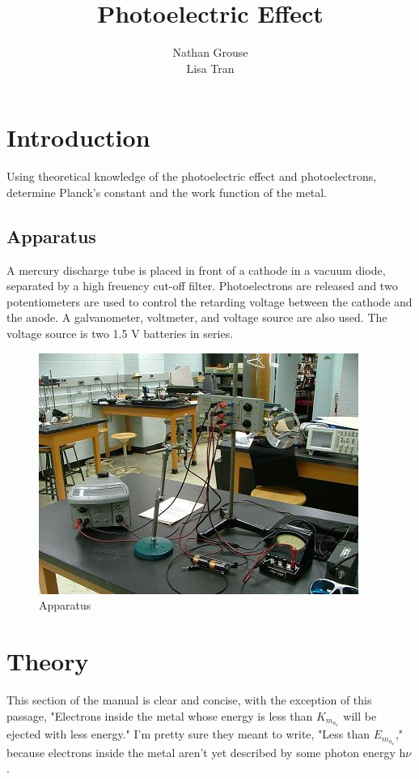 \documentclass[12pt]{article}
\title{Photoelectric Effect}
\author{Nathan Grouse\\Lisa Tran}
\begin{document}
\maketitle

\section{Introduction}
\indent \indent Using theoretical knowledge of the photoelectric effect and photoelectrons, determine Planck's constant and the work function of the metal.

\subsection{Apparatus}
\indent \indent A mercury discharge tube is placed in front of a cathode in a vacuum diode, separated by a high freuency cut-off filter. Photoelectrons are released and two potentiometers are used to control the retarding voltage between the cathode and the anode. A galvanometer, voltmeter, and voltage source are also used. The voltage source is two 1.5 V batteries in series.

\begin{figure}[H]
\centering
\hspace{-0.0in}\includegraphics[scale=1.0]{apparatus.png}
\caption{Apparatus \label{fig:setup}}
\end{figure}

\section{Theory}
\indent \indent This section of the manual is clear and concise, with the exception of this passage, "Electrons inside the metal whose energy is less than $K_m_a_x$ will be ejected with less energy." I'm pretty sure they meant to write, "Less than $E_m_a_x$," because electrons inside the metal aren't yet described by some photon energy h$\nu$.
\end{document}
